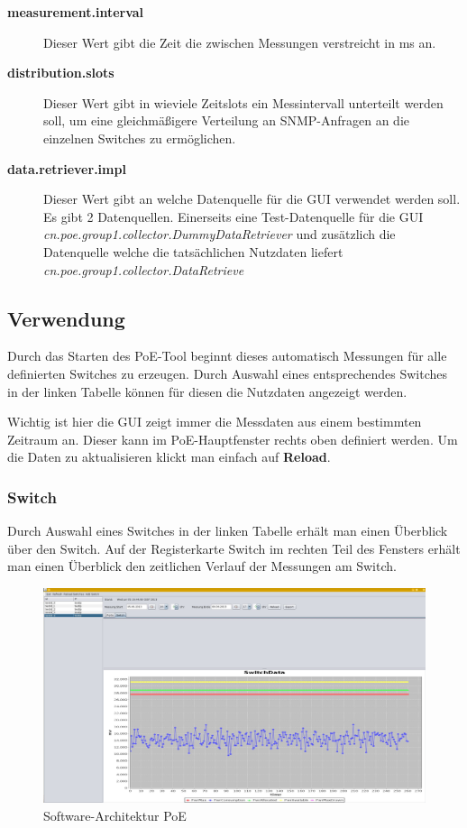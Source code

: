 \begin{description}
  \item [\textbf{measurement.interval}] Dieser Wert gibt die Zeit die zwischen
  Messungen verstreicht in ms an.
  \item [\textbf{distribution.slots}] Dieser Wert gibt in wieviele Zeitslots ein
  Messintervall unterteilt werden soll, um eine gleichmäßigere Verteilung an
  SNMP-Anfragen an die einzelnen Switches zu ermöglichen.
  \item [\textbf{data.retriever.impl}] Dieser Wert gibt an welche Datenquelle
  für die GUI verwendet werden soll. Es gibt 2 Datenquellen. Einerseits eine
  Test-Datenquelle für die GUI
  \textit{cn.poe.group1.collector.DummyDataRetriever} und zusätzlich die
  Datenquelle welche die tatsächlichen Nutzdaten liefert \textit{cn.poe.group1.collector.DataRetrieve}
\end{description}

\subsection{Verwendung}

Durch das Starten des PoE-Tool beginnt dieses automatisch Messungen für alle
definierten Switches zu erzeugen. Durch Auswahl eines entsprechendes Switches in
der linken Tabelle  können für diesen die Nutzdaten angezeigt werden.

Wichtig ist hier die GUI zeigt immer die Messdaten aus einem bestimmten Zeitraum
an. Dieser kann im PoE-Hauptfenster rechts oben definiert werden. Um die Daten
zu aktualisieren klickt man einfach auf \textbf{Reload}.

\subsubsection{Switch}

Durch Auswahl eines Switches in der linken Tabelle erhält man einen Überblick
über den Switch. Auf der Registerkarte Switch im rechten Teil des Fensters
erhält man einen Überblick den zeitlichen Verlauf der Messungen am Switch.

\begin{figure}[h]
    \centering
    \leavevmode
    \includegraphics[width=1.0\linewidth]{figures/screenshot2.jpg}
    \caption{Software-Architektur PoE}
    \label{fig:Architecture-PoE}
\end{figure}

